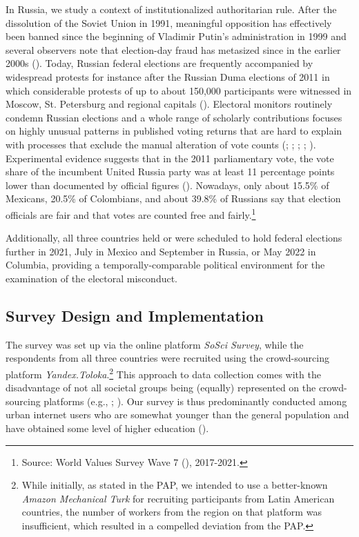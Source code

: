 \documentclass[11pt, ngerman,english,a4]{article}
\begin{document}
In Russia, we study a context of institutionalized authoritarian rule. After the dissolution of the Soviet Union in 1991, meaningful opposition has effectively been banned since the beginning of Vladimir Putin's administration in 1999 and several observers note that election-day fraud has metasized since in the earlier 2000s (\citealt{Myagkov2009}). Today, Russian federal elections are frequently accompanied by widespread protests for instance after the Russian Duma elections of 2011 in which considerable protests of up to about 150,000 participants were witnessed in Moscow, St. Petersburg and regional capitals (\citealt{Robertson2017}). Electoral monitors routinely condemn Russian elections and a whole range of scholarly contributions focuses on highly unusual patterns in published voting returns that are hard to explain with processes that exclude the manual alteration of vote counts (\citealt{Rozenas2017}; \citealt{Klimek2012}; \citealt{Myagkov2009}; \citealt{Jimenez2017}; \citealt{Kobak2016a, Kobak2016b, Kobak2018}). Experimental evidence suggests that in the 2011 parliamentary vote, the vote share of the incumbent United Russia party was at least 11 percentage points lower than documented by official figures (\citealt{Enikolopov2013}). Nowadays, only about 15.5\% of Mexicans, 20.5\% of Colombians, and about 39.8\% of Russians say that election officials are fair and that votes are counted free and fairly.\footnote{Source: World Values Survey Wave 7 (\citealt{Inglehart2020}), 2017-2021.}

Additionally, all three countries held or were scheduled to hold federal elections further in 2021, July in Mexico and September in Russia, or May 2022 in Columbia, providing a temporally-comparable political environment for the examination of the electoral misconduct. 

\subsection*{Survey Design and Implementation}
The survey was set up via the online platform \textit{SoSci Survey}, while the respondents from all three countries were recruited using the crowd-sourcing platform \textit{Yandex.Toloka}.\footnote{While initially, as stated in the PAP, we intended to use a better-known \textit{Amazon Mechanical Turk} for recruiting participants from Latin American countries, the number of workers from the region on that platform was insufficient, which resulted in a compelled deviation from the PAP. } 
This approach to data collection comes with the disadvantage of not all societal groups being (equally) represented on the crowd-sourcing platforms (e.g., \citealt{Bartneck2015}; \citealt{Berinsky2012}). Our survey is thus predominantly conducted among urban internet users who are somewhat younger than the general population and have obtained some level of higher education (\citealt{Berinsky2012}). 
\end{document}
